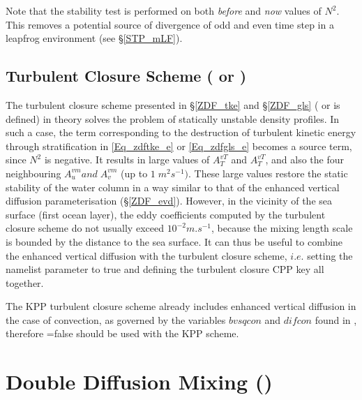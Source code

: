 \documentclass[NEMO_book]{subfiles}
\begin{document}
Note that the stability test is performed on both \textit{before} and \textit{now} 
values of $N^2$. This removes a potential source of divergence of odd and
even time step in a leapfrog environment \citep{Leclair_PhD2010} (see \S\ref{STP_mLF}).

\subsection{Turbulent Closure Scheme ( or )}
\label{ZDF_tcs}

The turbulent closure scheme presented in \S\ref{ZDF_tke} and \S\ref{ZDF_gls} 
( or  is defined) in theory solves the problem of statically 
unstable density profiles. In such a case, the term corresponding to the 
destruction of turbulent kinetic energy through stratification in \eqref{Eq_zdftke_e} 
or \eqref{Eq_zdfgls_e} becomes a source term, since $N^2$ is negative. 
It results in large values of $A_T^{vT}$ and  $A_T^{vT}$, and also the four neighbouring 
$A_u^{vm} {and}\;A_v^{vm}$ (up to $1\;m^2s^{-1})$. These large values 
restore the static stability of the water column in a way similar to that of the 
enhanced vertical diffusion parameterisation (\S\ref{ZDF_evd}). However, 
in the vicinity of the sea surface (first ocean layer), the eddy coefficients 
computed by the turbulent closure scheme do not usually exceed $10^{-2}m.s^{-1}$, 
because the mixing length scale is bounded by the distance to the sea surface. 
It can thus be useful to combine the enhanced vertical 
diffusion with the turbulent closure scheme, $i.e.$ setting the  
namelist parameter to true and defining the turbulent closure CPP key all together.

The KPP turbulent closure scheme already includes enhanced vertical diffusion 
in the case of convection, as governed by the variables $bvsqcon$ and $difcon$ 
found in , therefore =false should be used with the KPP 
scheme. %

\section  [Double Diffusion Mixing (\key{zdfddm})]
		{Double Diffusion Mixing ()}
\label{ZDF_ddm}
\end{document}
